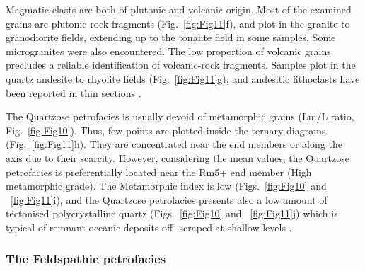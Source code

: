 \documentclass[twoside]{article}
\begin{document}
\medskip
Magmatic clasts are both of plutonic and volcanic origin. Most of the examined grains are plutonic rock-fragments (Fig.~\ref{fig:Fig11}f), and plot in the granite to granodiorite fields, extending up to the tonalite field in some samples. Some microgranites were also encountered. The low proportion of volcanic grains precludes a reliable identification of volcanic-rock fragments. Samples plot in the quartz andesite to rhyolite fields (Fig.~\ref{fig:Fig11}g), and andesitic lithoclasts have been reported in thin sections \citep{Ospina-Ostios2013}.\par
\medskip
The Quartzose petrofacies is usually devoid of metamorphic grains (Lm/L ratio, Fig.~\ref{fig:Fig10}). Thus, few points are plotted inside the ternary diagrams (Fig.~\ref{fig:Fig11}h). They are concentrated near the end members or along the axis due to their scarcity. However, considering the mean values, the Quartzose petrofacies is preferentially located near the Rm5+ end member (High metamorphic grade). The Metamorphic index is low (Figs.~\ref{fig:Fig10} and ~\ref{fig:Fig11}i), and the Quartzose petrofacies presents also a low amount of tectonised polycrystalline quartz (Figs.~\ref{fig:Fig10} and ~\ref{fig:Fig11}j) which is typical of remnant oceanic deposits off- scraped at shallow levels \citep{Garzanti2010}.

\subsubsection{The Feldspathic petrofacies}
\end{document}

